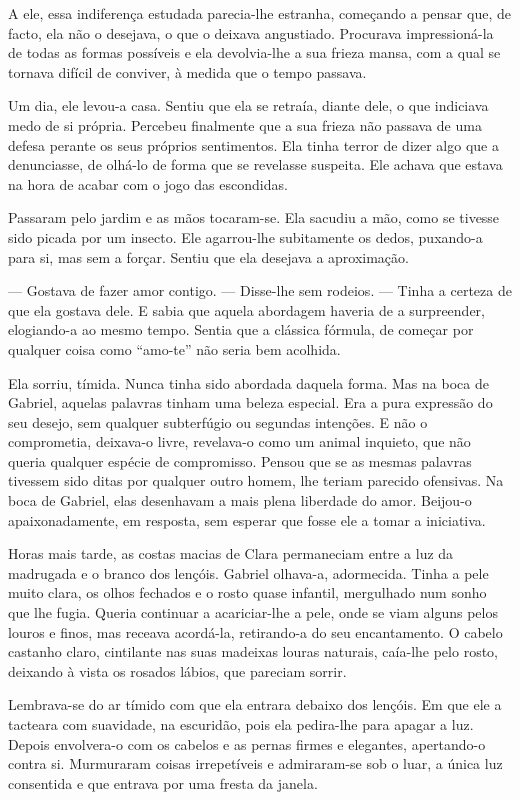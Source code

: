 A ele, essa indiferença estudada parecia-lhe estranha, começando a
pensar que, de facto, ela não o desejava, o que o deixava angustiado.
Procurava impressioná-la de todas as formas possíveis e ela devolvia-lhe
a sua frieza mansa, com a qual se tornava difícil de conviver, à medida
que o tempo passava.

Um dia, ele levou-a casa. Sentiu que ela se retraía, diante dele, o que
indiciava medo de si própria. Percebeu finalmente que a sua frieza não
passava de uma defesa perante os seus próprios sentimentos. Ela tinha
terror de dizer algo que a denunciasse, de olhá-lo de forma que se
revelasse suspeita. Ele achava que estava na hora de acabar com o jogo
das escondidas.

Passaram pelo jardim e as mãos tocaram-se. Ela sacudiu a mão, como se
tivesse sido picada por um insecto. Ele agarrou-lhe subitamente os
dedos, puxando-a para si, mas sem a forçar. Sentiu que ela desejava a
aproximação.

--- Gostava de fazer amor contigo. --- Disse-lhe sem rodeios. --- Tinha a
certeza de que ela gostava dele. E sabia que aquela abordagem haveria de
a surpreender, elogiando-a ao mesmo tempo. Sentia que a clássica
fórmula, de começar por qualquer coisa como ``amo-te'' não seria bem
acolhida.

Ela sorriu, tímida. Nunca tinha sido abordada daquela forma. Mas na boca
de Gabriel, aquelas palavras tinham uma beleza especial. Era a pura
expressão do seu desejo, sem qualquer subterfúgio ou segundas intenções.
E não o comprometia, deixava-o livre, revelava-o como um animal
inquieto, que não queria qualquer espécie de compromisso. Pensou que se
as mesmas palavras tivessem sido ditas por qualquer outro homem, lhe
teriam parecido ofensivas. Na boca de Gabriel, elas desenhavam a mais
plena liberdade do amor. Beijou-o apaixonadamente, em resposta, sem
esperar que fosse ele a tomar a iniciativa.

Horas mais tarde, as costas macias de Clara permaneciam entre a luz da
madrugada e o branco dos lençóis. Gabriel olhava-a, adormecida. Tinha a
pele muito clara, os olhos fechados e o rosto quase infantil, mergulhado
num sonho que lhe fugia. Queria continuar a acariciar-lhe a pele, onde
se viam alguns pelos louros e finos, mas receava acordá-la, retirando-a
do seu encantamento. O cabelo castanho claro, cintilante nas suas
madeixas louras naturais, caía-lhe pelo rosto, deixando à vista os
rosados lábios, que pareciam sorrir.

Lembrava-se do ar tímido com que ela entrara debaixo dos lençóis. Em que
ele a tacteara com suavidade, na escuridão, pois ela pedira-lhe para
apagar a luz. Depois envolvera-o com os cabelos e as pernas firmes e
elegantes, apertando-o contra si. Murmuraram coisas irrepetíveis e
admiraram-se sob o luar, a única luz consentida e que entrava por uma
fresta da janela.


